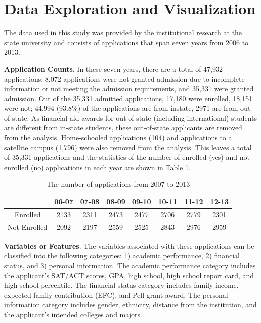 \documentclass[12pt,english]{report}
\begin{document}
\section{Data Exploration and Visualization}
The data used in this study was provided by the institutional research at the state university and consists of  applications that span seven years from 2006 to 2013. 

\noindent \textbf{Application Counts}. In these seven years, there are a total of 47,932 applications; 8,072 applications were not granted admission due to incomplete information or not meeting the admission requirements, and 35,331 were granted admission. Out of the 35,331 admitted applications, 17,180 were enrolled, 18,151 were not; 44,994 (93.8\%) of the applications are from instate, 2971 are from out-of-state. As financial aid awards for out-of-state (including international) students are different from in-state students, these out-of-state applicants are removed from the analysis. Home-schooled applications (104) and applications to a satellite campus (1,796) were also removed from the analysis. This leaves a total of 35,331 applications and the statistics of the number of enrolled (yes) and not enrolled (no) applications in each year are shown in Table \ref{enroll_year_sum}.

\begin{table}[H]
\centering
\begin{tabular}{|c|c|c|c|c|c|c|c|} \hline
          & 06-07 & 07-08 & 08-09 & 09-10 & 10-11 & 11-12 & 12-13 \\ \hline
Enrolled  & 2133  & 2311  & 2473  & 2477  & 2706  & 2779  & 2301  \\ \hline
Not Enrolled   & 2092  & 2197  & 2559  & 2525  & 2843  & 2976  & 2959\\ \hline
\end{tabular}
\caption{The number of applications from 2007 to 2013}
\label{enroll_year_sum}
\end{table}

\vspace{0.15in}
\noindent \textbf{Variables or Features}. The variables associated with these applications can be classified into the following categories: 1) academic performance, 2) financial status, and 3) personal information. The academic performance category includes the applicant's SAT/ACT  scores, GPA, high school, high school report card, and high school percentile. The  financial status category includes family income, expected family contribution (EFC), and Pell grant award. The personal information category includes gender,  ethnicity, distance from the institution, and the applicant's intended colleges and majors.
\end{document}
